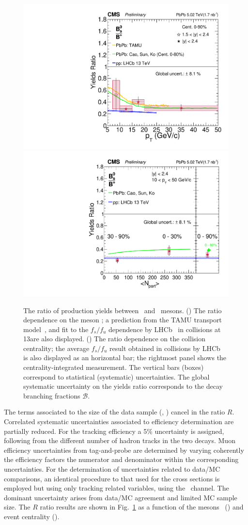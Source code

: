 \begin{figure}[t]
\centering
\includegraphics[width=.48\textwidth]{ratio_bsbu_vsPt.pdf}
\includegraphics[width=.48\textwidth]{ratio_bsbu_vsCent.pdf}
\caption{The ratio of production yields between \PBzs\ and \PBp\ mesons. 
(\cmsLeft) The ratio dependence on the meson \pt; a prediction from the TAMU transport model~\cite{tamu14}, and fit to the $f_s/f_u$ \pt dependence by LHCb~\cite{fsfulhcb2019} in \pp collisions at 13\TeV are also displayed. 
(\cmsRight) The ratio dependence on the collision centrality; 
the average $f_s/f_u$ result obtained in \TeV collisions by LHCb~\cite{fsfulhcb2013} is also displayed as an horizontal bar; 
the rightmost panel shows the centrality-integrated measurement.  
The vertical bars (boxes) correspond to statistical (systematic) uncertainties.
The global systematic uncertainty on the yields ratio corresponds to the decay branching fractions $\mathcal{B}$.}
\label{fig:ratio}
\end{figure}

The terms associated to the size of the data sample (\TAA, \NMB) cancel in the ratio $R$. 
Correlated systematic uncertainties associated to efficiency determination are partially reduced. 
For the tracking efficiency a 5\% uncertainty is assigned, following from the different number of hadron tracks in the two decays.
Muon efficiency uncertainties from tag-and-probe are determined by varying coherently the efficiency factors the numerator and denominator within the corresponding uncertainties. 
For the determination of uncertainties related to data/MC comparisons, an identical procedure to that used for the cross sections is employed but using only tracking related variables, using the \PBp\ channel. 
The dominant uncertainty arises from data/MC agreement and limited MC sample size. 
%
The $R$ ratio results 
are shown in Fig.~\ref{fig:ratio} 
as a function of the mesons \pt\ (\cmsLeft) and event centrality (\cmsRight).

